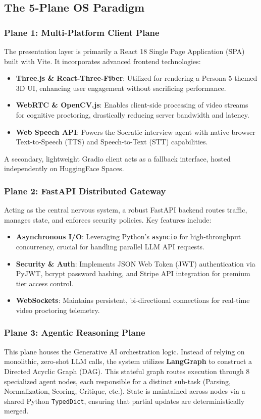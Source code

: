 \documentclass[10pt,journal,compsoc]{IEEEtran}
\begin{document}
\subsection{The 5-Plane OS Paradigm}

\subsubsection{Plane 1: Multi-Platform Client Plane}
The presentation layer is primarily a React 18 Single Page Application (SPA) built with Vite. It incorporates advanced frontend technologies:
\begin{itemize}
    \item \textbf{Three.js \& React-Three-Fiber}: Utilized for rendering a Persona 5-themed 3D UI, enhancing user engagement without sacrificing performance.
    \item \textbf{WebRTC \& OpenCV.js}: Enables client-side processing of video streams for cognitive proctoring, drastically reducing server bandwidth and latency.
    \item \textbf{Web Speech API}: Powers the Socratic interview agent with native browser Text-to-Speech (TTS) and Speech-to-Text (STT) capabilities.
\end{itemize}
A secondary, lightweight Gradio client acts as a fallback interface, hosted independently on HuggingFace Spaces.

\subsubsection{Plane 2: FastAPI Distributed Gateway}
Acting as the central nervous system, a robust FastAPI backend routes traffic, manages state, and enforces security policies. Key features include:
\begin{itemize}
    \item \textbf{Asynchronous I/O}: Leveraging Python's \texttt{asyncio} for high-throughput concurrency, crucial for handling parallel LLM API requests.
    \item \textbf{Security \& Auth}: Implements JSON Web Token (JWT) authentication via PyJWT, bcrypt password hashing, and Stripe API integration for premium tier access control.
    \item \textbf{WebSockets}: Maintains persistent, bi-directional connections for real-time video proctoring telemetry.
\end{itemize}

\subsubsection{Plane 3: Agentic Reasoning Plane}
This plane houses the Generative AI orchestration logic. Instead of relying on monolithic, zero-shot LLM calls, the system utilizes \textbf{LangGraph} to construct a Directed Acyclic Graph (DAG). This stateful graph routes execution through 8 specialized agent nodes, each responsible for a distinct sub-task (Parsing, Normalization, Scoring, Critique, etc.). State is maintained across nodes via a shared Python \texttt{TypedDict}, ensuring that partial updates are deterministically merged.
\end{document}
